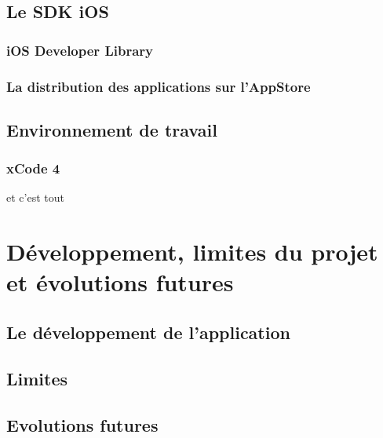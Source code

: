 \documentclass[11pt, french]{report}
\begin{document}
\section{Le SDK iOS}

\subsection{iOS Developer Library}


\subsection{La distribution des applications sur l’AppStore}


\section{Environnement de travail}

\subsection{xCode 4}

et c’est tout





\chapter{Développement, limites du projet et évolutions futures}

\section{Le développement de l’application}







\section{Limites}







\section{Evolutions futures}
\end{document}
